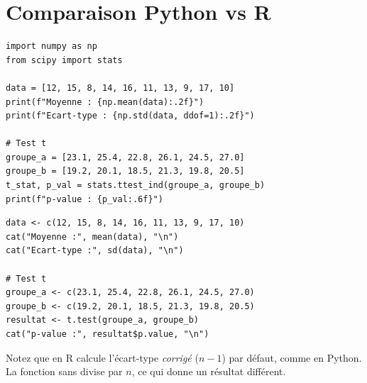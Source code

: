 \section{Comparaison Python vs R}

\begin{exemple}

\begin{codeblock}[title=\textbf{Python}]
\begin{verbatim}
import numpy as np
from scipy import stats

data = [12, 15, 8, 14, 16, 11, 13, 9, 17, 10]
print(f"Moyenne : {np.mean(data):.2f}")
print(f"Ecart-type : {np.std(data, ddof=1):.2f}")

# Test t
groupe_a = [23.1, 25.4, 22.8, 26.1, 24.5, 27.0]
groupe_b = [19.2, 20.1, 18.5, 21.3, 19.8, 20.5]
t_stat, p_val = stats.ttest_ind(groupe_a, groupe_b)
print(f"p-value : {p_val:.6f}")
\end{verbatim}
\end{codeblock}

\begin{codeblock}[title=\textbf{R}]
\begin{verbatim}
data <- c(12, 15, 8, 14, 16, 11, 13, 9, 17, 10)
cat("Moyenne :", mean(data), "\n")
cat("Ecart-type :", sd(data), "\n")

# Test t
groupe_a <- c(23.1, 25.4, 22.8, 26.1, 24.5, 27.0)
groupe_b <- c(19.2, 20.1, 18.5, 21.3, 19.8, 20.5)
resultat <- t.test(groupe_a, groupe_b)
cat("p-value :", resultat$p.value, "\n")
\end{verbatim}
\end{codeblock}
\end{exemple}

\begin{remarque}
Notez que  en R calcule l'\'ecart-type \emph{corrig\'e} ($n-1$) par d\'efaut,
comme  en Python. La fonction  sans
 divise par $n$, ce qui donne un r\'esultat diff\'erent.
\end{remarque}

